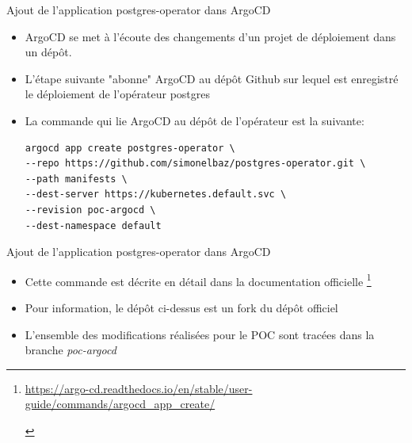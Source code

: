 
\begin{frame}[fragile]{Ajout de l'application postgres-operator dans ArgoCD}

\begin{itemize}
   \item ArgoCD se met à l'écoute des changements d'un projet de déploiement dans un dépôt.
   \item L'étape suivante "abonne" ArgoCD au dépôt Github sur lequel est enregistré le déploiement de l'opérateur postgres
   \item La commande qui lie ArgoCD au dépôt de l'opérateur est la suivante:
\begin{tiny}
\begin{Verbatim}[commandchars=\&\#\#]
argocd app create postgres-operator \
--repo https://github.com/simonelbaz/postgres-operator.git \
--path manifests \
--dest-server https://kubernetes.default.svc \
--revision poc-argocd \
--dest-namespace default
\end{Verbatim}
\end{tiny}
\end{itemize}

\end{frame}


\begin{frame}[fragile]{Ajout de l'application postgres-operator dans ArgoCD}

\begin{itemize}
   \item Cette commande est décrite en détail dans la documentation  officielle \footnote{
         \begin{tcolorbox}
         \url{https://argo-cd.readthedocs.io/en/stable/user-guide/commands/argocd_app_create/}
         \end{tcolorbox}
      }
   \item Pour information, le dépôt ci-dessus est un fork du dépôt officiel
   \item L'ensemble des modifications réalisées pour le POC sont tracées dans la branche \textit{poc-argocd}
\end{itemize}

\end{frame}


